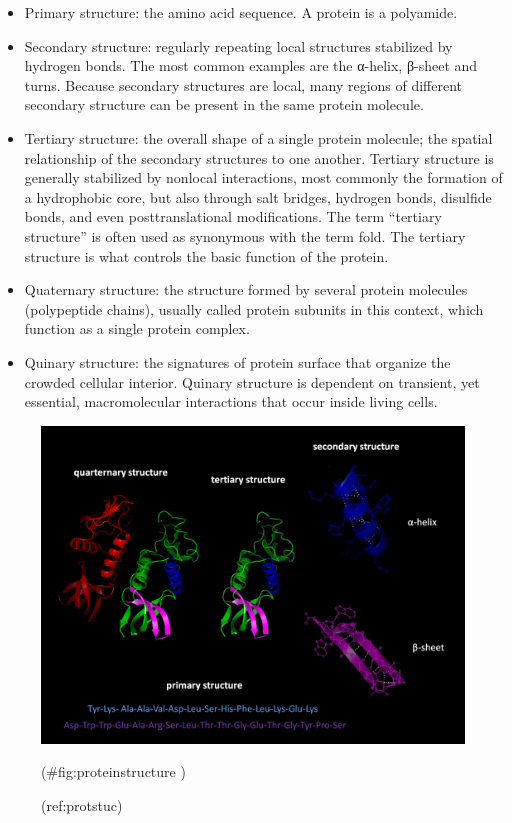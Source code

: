\begin{itemize}
\tightlist
\item
  Primary structure: the amino acid sequence. A protein is a polyamide.
\item
  Secondary structure: regularly repeating local structures stabilized by hydrogen bonds. The most common examples are the α-helix, β-sheet and turns. Because secondary structures are local, many regions of different secondary structure can be present in the same protein molecule.
\item
  Tertiary structure: the overall shape of a single protein molecule; the spatial relationship of the secondary structures to one another. Tertiary structure is generally stabilized by nonlocal interactions, most commonly the formation of a hydrophobic core, but also through salt bridges, hydrogen bonds, disulfide bonds, and even posttranslational modifications. The term ``tertiary structure'' is often used as synonymous with the term fold. The tertiary structure is what controls the basic function of the protein.
\item
  Quaternary structure: the structure formed by several protein molecules (polypeptide chains), usually called protein subunits in this context, which function as a single protein complex.
\item
  Quinary structure: the signatures of protein surface that organize the crowded cellular interior. Quinary structure is dependent on transient, yet essential, macromolecular interactions that occur inside living cells.
\end{itemize}



\begin{figure}

{\centering \includegraphics[width=0.7\linewidth]{./figures/chemistry/Protein_structure} 

}

\caption{(ref:protstuc)}(\#fig:proteinstructure )
\end{figure}


